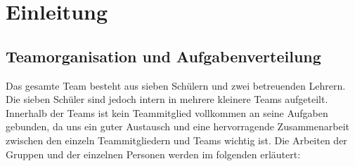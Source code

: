 \section{Einleitung}
\subsection{Teamorganisation und Aufgabenverteilung }

Das gesamte Team besteht aus sieben Schülern und zwei betreuenden Lehrern. Die sieben Schüler sind jedoch intern in mehrere kleinere Teams aufgeteilt. Innerhalb der Teams ist kein Teammitglied vollkommen an seine Aufgaben gebunden, da uns ein guter Austausch und eine hervorragende Zusammenarbeit zwischen den einzeln Teammitgliedern und Teams wichtig ist. Die Arbeiten der Gruppen und der einzelnen Personen werden im folgenden erläutert:

